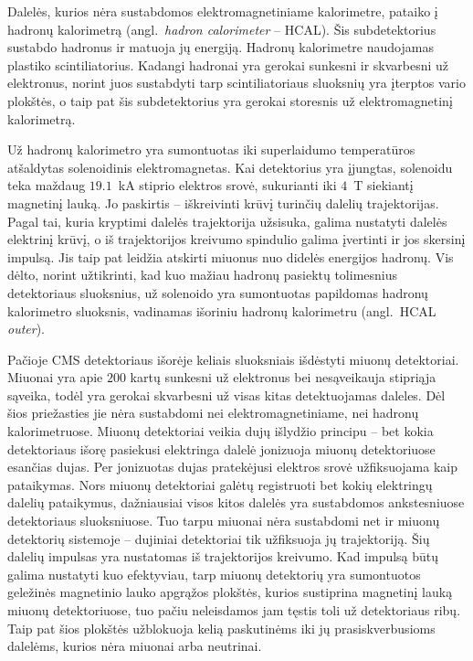\documentclass[a4paper, 12pt, oneside]{article}
\begin{document}
Dalelės, kurios nėra sustabdomos elektromagnetiniame kalorimetre, pataiko į hadronų kalorimetrą (angl.\ \textit{hadron calorimeter} -- HCAL).
Šis subdetektorius sustabdo hadronus ir matuoja jų energiją.
Hadronų kalorimetre naudojamas plastiko scintiliatorius.
Kadangi hadronai yra gerokai sunkesni ir skvarbesni už elektronus, norint juos sustabdyti tarp scintiliatoriaus sluoksnių yra įterptos
vario plokštės, o taip pat šis subdetektorius yra gerokai storesnis už elektromagnetinį kalorimetrą.

Už hadronų kalorimetro yra sumontuotas iki superlaidumo temperatūros atšaldytas solenoidinis elektromagnetas.
Kai detektorius yra įjungtas, solenoidu teka maždaug $19.1$~kA stiprio elektros srovė, sukurianti iki $4$~T siekiantį magnetinį lauką.
Jo paskirtis -- iškreivinti krūvį turinčių dalelių trajektorijas.
Pagal tai, kuria kryptimi dalelės trajektorija užsisuka, galima nustatyti dalelės elektrinį krūvį,
o iš trajektorijos kreivumo spindulio galima įvertinti ir jos skersinį impulsą.
Jis taip pat leidžia atskirti miuonus nuo didelės energijos hadronų.
Vis dėlto, norint užtikrinti, kad kuo mažiau hadronų pasiektų tolimesnius detektoriaus sluoksnius, už
solenoido yra sumontuotas papildomas hadronų kalorimetro sluoksnis, vadinamas išoriniu hadronų kalorimetru
(angl.\ HCAL \textit{outer}).

Pačioje CMS detektoriaus išorėje keliais sluoksniais išdėstyti miuonų detektoriai.
Miuonai yra apie $200$ kartų sunkesni už elektronus bei nesąveikauja stipriąja sąveika, todėl yra gerokai skvarbesni
už visas kitas detektuojamas daleles.
Dėl šios priežasties jie nėra sustabdomi nei elektromagnetiniame, nei hadronų kalorimetruose.
Miuonų detektoriai veikia dujų išlydžio principu -- bet kokia detektoriaus išorę pasiekusi elektringa dalelė jonizuoja
miuonų detektoriuose esančias dujas.
Per jonizuotas dujas pratekėjusi elektros srovė užfiksuojama kaip pataikymas.
Nors miuonų detektoriai galėtų registruoti bet kokių elektringų dalelių pataikymus, dažniausiai visos
kitos dalelės yra sustabdomos ankstesniuose detektoriaus sluoksniuose.
Tuo tarpu miuonai nėra sustabdomi net ir miuonų detektorių sistemoje -- dujiniai detektoriai tik užfiksuoja jų
trajektoriją.
Šių dalelių impulsas yra nustatomas iš trajektorijos kreivumo.
Kad impulsą būtų galima nustatyti kuo efektyviau, tarp miuonų detektorių yra sumontuotos geležinės magnetinio
lauko apgrąžos plokštės, kurios sustiprina magnetinį lauką miuonų detektoriuose, tuo pačiu neleisdamos jam tęstis toli
už detektoriaus ribų.
Taip pat šios plokštės užblokuoja kelią paskutinėms iki jų prasiskverbusioms dalelėms, kurios nėra miuonai
arba neutrinai.
\end{document}
